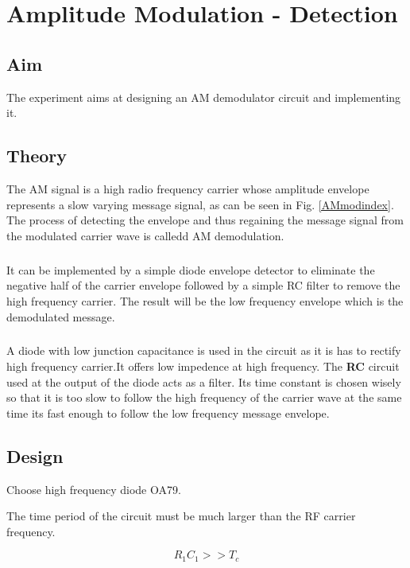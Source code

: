 \documentclass{book}
\begin{document}
\chapter[Amplitude Modulation - Detection]{Amplitude Modulation - Detection}
\section*{Aim}
The experiment aims at designing an AM demodulator circuit and implementing it.

\section*{Theory}
The AM signal is a high radio frequency carrier whose amplitude envelope represents a slow varying message signal, as can be seen in Fig. \ref{AMmodindex}. The process of detecting the envelope and thus regaining the message signal from the modulated carrier wave is calledd AM demodulation.
\paragraph{}
It can be implemented by a simple diode envelope detector to eliminate the negative half of the carrier envelope followed by a simple RC filter to remove the high frequency carrier. The result will be the low frequency envelope which is the demodulated message.
\paragraph{}
A diode with low junction capacitance is used in the circuit as it is has to rectify high frequency carrier.It offers low impedence at high frequency. The \textbf{RC} circuit used at the output of the diode acts as a filter. Its time constant is chosen wisely so that it is too slow to follow the high frequency of the carrier wave at the same time its fast enough to follow the low frequency message envelope. 


\section*{Design}
Choose high frequency diode OA79.

\noindent The time period of the circuit must be much larger than the RF carrier frequency.

\begin{equation}
R_1C_1 >> T_c
\end{equation}
\end{document}
